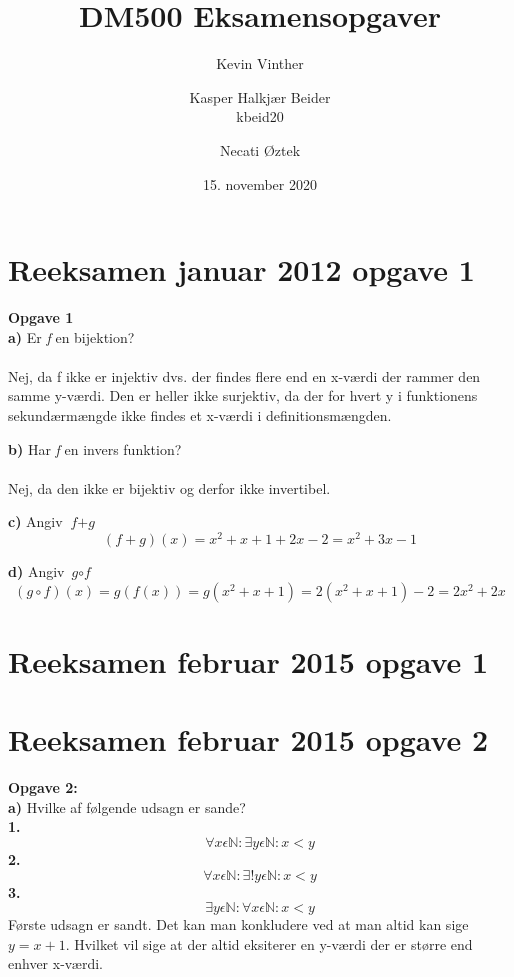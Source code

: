 \documentclass{article}
\title{DM500 Eksamensopgaver}
\author{ Kevin Vinther \and Kasper Halkjær Beider\\kbeid20 \and Necati Øztek}
\date{15. november 2020}
\begin{document}
\maketitle

\newpage

\section{Reeksamen januar 2012 opgave 1}
\textbf{Opgave 1}\\

\textbf{a)} Er \textit{f} en bijektion?\\
\\Nej, da f ikke er injektiv dvs. der findes flere end en x-værdi der rammer den samme y-værdi. Den er heller ikke surjektiv, da der for hvert y i funktionens sekundærmængde ikke findes et x-værdi i definitionsmængden.

\textbf{b)} Har \textit{f} en invers funktion?\\
\\Nej, da den ikke er bijektiv og derfor ikke invertibel.

\textbf{c)} Angiv $\textit{f} + \textit{g}$
\[(f+g)(x)=x^2+x+1+2x-2=x^2+3x-1\]

\textbf{d)} Angiv $\textit{g} \circ \textit{f}$
\[(g \circ f)(x)=g(f(x))=g(x^2+x+1)=2(x^2+x+1)-2=2x^2+2x\]
\section{Reeksamen februar 2015 opgave 1}

\section{Reeksamen februar 2015 opgave 2}

\textbf{Opgave 2:}\\
\textbf{a)} Hvilke af følgende udsagn er sande?\\
\textbf{1.} 
\begin{displaymath}
\forall x \epsilon \mathbb{N}: \exists y \epsilon \mathbb{N}: x<y
\end{displaymath}
\textbf{2.}\begin{displaymath}
\forall x \epsilon \mathbb{N}: \exists !y \epsilon \mathbb{N}: x<y
\end{displaymath}
\textbf{3.}\begin{displaymath}
\exists y  \epsilon \mathbb{N}: \forall x  \epsilon  \mathbb{N}: x<y
\end{displaymath}
Første udsagn er sandt. Det kan man konkludere ved at man altid kan sige \(y = x + 1\). Hvilket vil sige at der altid eksiterer en y-værdi der er større end enhver x-værdi. 
\end{document}
